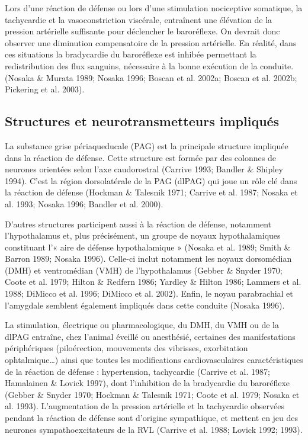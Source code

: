 \documentclass[a4paper,12pt,twoside]{report}
\begin{document}
Lors d’une réaction de défense ou lors d’une stimulation nociceptive somatique, la tachycardie et la vasoconstriction viscérale, entraînent une élévation de la pression artérielle suffisante pour déclencher le baroréflexe. On devrait donc observer une diminution compensatoire de la pression artérielle. En réalité, dans ces situations la bradycardie du baroréflexe est inhibée permettant la redistribution des flux sanguins, nécessaire à la bonne exécution de la conduite. (Nosaka \& Murata 1989; Nosaka 1996; Boscan et al. 2002a; Boscan et al. 2002b; Pickering et al. 2003).

\subsection{Structures et neurotransmetteurs impliqués}

La substance grise périaqueducale (PAG) est la principale structure impliquée dans la réaction de défense. Cette structure est formée par des colonnes de neurones orientées selon l’axe caudorostral (Carrive 1993; Bandler \& Shipley 1994). C’est la région dorsolatérale de la PAG (dlPAG) qui joue un rôle clé dans la réaction de défense (Hockman \& Talesnik 1971; Carrive et al. 1987; Nosaka et al. 1993; Nosaka 1996; Bandler et al. 2000). 

D'autres structures participent aussi à la réaction de défense, notamment l’hypothalamus et, plus précisément, un groupe de noyaux hypothalamiques constituant l’« aire de défense hypothalamique » (Nosaka et al. 1989; Smith \& Barron 1989; Nosaka 1996). Celle-ci inclut notamment les noyaux dorsomédian (DMH) et ventromédian (VMH) de l’hypothalamus (Gebber \& Snyder 1970; Coote et al. 1979; Hilton \& Redfern 1986; Yardley \& Hilton 1986; Lammers et al. 1988; DiMicco et al. 1996; DiMicco et al. 2002). Enfin, le noyau parabrachial et l’amygdale semblent également impliqués dans cette conduite (Nosaka 1996).

La stimulation, électrique ou pharmacologique, du DMH, du VMH ou de la dlPAG entraîne, chez l’animal éveillé ou anesthésié, certaines des manifestations périphériques (piloérection, mouvements des vibrisses, exorbitation ophtalmique\ldots) ainsi que toutes les modifications cardiovasculaires caractéristiques de la réaction de défense : hypertension, tachycardie (Carrive et al. 1987; Hamalainen \& Lovick 1997), dont l’inhibition de la bradycardie du baroréflexe (Gebber \& Snyder 1970; Hockman \& Talesnik 1971; Coote et al. 1979; Nosaka et al. 1993). L’augmentation de la pression artérielle et la tachycardie observées pendant la réaction de défense sont d’origine sympathique, et mettent en jeu des neurones sympathoexcitateurs de la RVL (Carrive et al. 1988; Lovick 1992; 1993).
\end{document}

